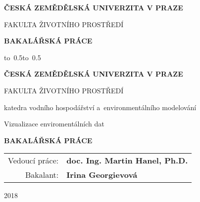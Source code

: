 \documentclass[12pt,a4paper]{report}
\begin{document}


\pagestyle{empty}
\begin{center}

\large

{\bf ČESKÁ ZEMĚDĚLSKÁ UNIVERZITA V PRAZE}

\medskip

FAKULTA ŽIVOTNÍHO PROSTŘEDÍ

\vfill

\vfill

{\bf \Large BAKALÁŘSKÁ PRÁCE}

\vfill

\vspace{10cm}

\vfill


\hbox{\hbox to 0.5\hsize{%
2018
\hss}\hbox to 0.5}

\end{center}
\pagestyle{empty}
\newpage
\begin{center}

\large

{ \bf ČESKÁ ZEMĚDĚLSKÁ UNIVERZITA V PRAZE}

\medskip

FAKULTA ŽIVOTNÍHO PROSTŘEDÍ

\medskip

{\sc \Large katedra vodního hospodářství a~environmentálního modelování}

\vfill

\vfill

{\LARGE Vizualizace enviromentálních dat}

\vspace{2mm}

{\bf \Large BAKALÁŘSKÁ PRÁCE}

\vspace{15mm}

\vfill

\vfill

\begin{tabular}{rl}

\noalign{\vspace{2mm}}
Vedoucí práce: & \bf doc. Ing. Martin Hanel, Ph.D. \\
\noalign{\vspace{2mm}}
Bakalant: & \bf Irina Georgievová \\
\end{tabular}

\vfill

2018

\end{center}
\newpage

\newpage
\end{document}

